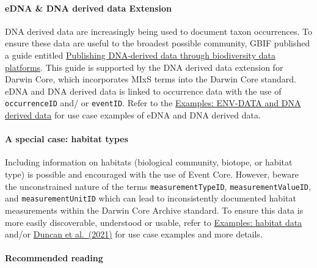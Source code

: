 \documentclass[
  letterpaper,
  DIV=11,
  numbers=noendperiod,
  oneside]{scrreprt}
\let\oldparagraph\paragraph
\renewcommand{\paragraph}[1]{\oldparagraph{#1}\mbox{}}
\begin{document}
\hypertarget{edna-dna-derived-data-extension}{%
\paragraph{eDNA \& DNA derived data
Extension}\label{edna-dna-derived-data-extension}}

DNA derived data are increasingly being used to document taxon
occurrences. To ensure these data are useful to the broadest possible
community, GBIF published a guide entitled
\href{https://docs.gbif-uat.org/publishing-dna-derived-data/1.0/en/}{Publishing
DNA-derived data through biodiversity data platforms}. This guide is
supported by the DNA derived data extension for Darwin Core, which
incorporates MIxS terms into the Darwin Core standard. eDNA and DNA
derived data is linked to occurrence data with the use of
\texttt{occurrenceID} and/ or \texttt{eventID}. Refer to the
\href{dna_data.html}{Examples: ENV-DATA and DNA derived data} for use
case examples of eDNA and DNA derived data.

\hypertarget{a-special-case-habitat-types}{%
\paragraph{A special case: habitat
types}\label{a-special-case-habitat-types}}

Including information on habitats (biological community, biotope, or
habitat type) is possible and encouraged with the use of Event Core.
However, beware the unconstrained nature of the terms
\texttt{measurementTypeID}, \texttt{measurementValueID}, and
\texttt{measurementUnitID} which can lead to inconsistently documented
habitat measurements within the Darwin Core Archive standard. To ensure
this data is more easily discoverable, understood or usable, refer to
\protect\hyperlink{habitat-data}{Examples: habitat data} and/or
\href{https://emodnet.ec.europa.eu/en/reports?field_emodnet_lot_value\%5B\%5D=seabed_habitats\#h3298bcd0a15741a8a0ac1c8b4576f7c5}{Duncan
et al.~(2021)} for use case examples and more details.

\hypertarget{recommended-reading}{%
\paragraph{Recommended reading}\label{recommended-reading}}
\end{document}
